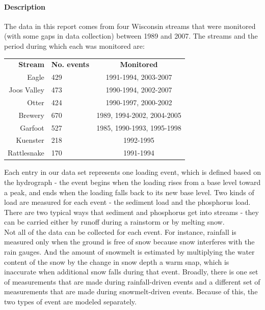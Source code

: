 \documentclass[12pt]{article}
\begin{document}
\paragraph{Description}
The data in this report comes from four Wisconsin streams that were monitored (with some gaps in data collection) between 1989 and 2007. The streams and the period during which each was monitored are:

\begin{table}[h]
\begin{center}
\begin{tabular}{r l c}
        \textbf{Stream}  & \textbf{No. events} & \textbf{Monitored}\\
        Eagle & 429 &1991-1994, 2003-2007\\
        Joos Valley & 473 & 1990-1994, 2002-2007\\
        Otter & 424 & 1990-1997, 2000-2002\\
        Brewery & 670 & 1989, 1994-2002, 2004-2005\\
        Garfoot & 527 & 1985, 1990-1993, 1995-1998\\
        Kuenster & 218 & 1992-1995\\
        Rattlesnake & 170 & 1991-1994\\
    \end{tabular}
\end{center}
\end{table}

Each entry in our data set represents one loading event, which is defined based on the hydrograph - the event begins when the loading rises from a base level toward a peak, and ends when the loading falls back to its new base level. Two kinds of load are measured for each event - the sediment load and the phosphorus load. There are two typical ways that sediment and phosphorus get into streams - they can be carried either by runoff during a rainstorm or by melting snow.\\

Not all of the data can be collected for each event. For instance, rainfall is measured only when the ground is free of snow because snow interferes with the rain gauges. And the amount of snowmelt is estimated by multiplying the water content of the snow by the change in snow depth a warm snap, which is inaccurate when additional snow falls during that event. Broadly, there is one set of measurements that are made during rainfall-driven events and a different set of measurements that are made during snowmelt-driven events. Because of this, the two types of event are modeled separately.\\
\end{document}
